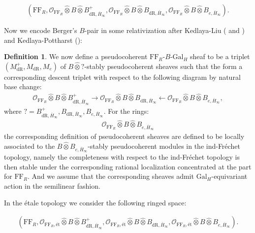 \documentclass[12pt]{amsart}
\theoremstyle{definition}
\newtheorem{definition}[theorem]{Definition}
\numberwithin{equation}{section}
\begin{document}
\begin{align}
(\mathrm{FF}_R,\mathcal{O}_{\mathrm{FF}_R}\widehat{\otimes}B\widehat{\otimes}B_{\mathrm{dR},\overline{H}_\infty}^+,\mathcal{O}_{\mathrm{FF}_R}\widehat{\otimes}B\widehat{\otimes}B_{\mathrm{dR},\overline{H}_\infty},\mathcal{O}_{\mathrm{FF}_R}\widehat{\otimes}B\widehat{\otimes}B_{e,\overline{H}_\infty}).	
\end{align}


\indent Now we encode Berger's $B$-pair in some relativization after Kedlaya-Liu (\cite[Definition 9.3.11]{KL1} and \cite[Definition 4.8.2]{KL2}) and Kedlaya-Pottharst (\cite[Definition 2.17]{KP}):

\begin{definition}
We now define a pseudocoherent $\mathrm{FF}_R$-$B$-$\mathrm{Gal}_H$ sheaf to be a triplet $(M^+_\mathrm{dR},M_\mathrm{dR},M_e)$ of $B\widehat{\otimes}?$-stably pseudocoherent sheaves such that the form a corresponding descent triplet with respect to the following diagram by natural base change:
\begin{align}
\mathcal{O}_{\mathrm{FF}_R}\widehat{\otimes}B\widehat{\otimes}B_{\mathrm{dR},\overline{H}_\infty}^+ \longrightarrow \mathcal{O}_{\mathrm{FF}_R}\widehat{\otimes}B\widehat{\otimes}B_{\mathrm{dR},\overline{H}_\infty}\longleftarrow \mathcal{O}_{\mathrm{FF}_R}\widehat{\otimes}B\widehat{\otimes}B_{e,\overline{H}_\infty},	
\end{align}
where $?=B_{\mathrm{dR},\overline{H}_\infty}^+,B_{\mathrm{dR},\overline{H}_\infty},B_{e,\overline{H}_\infty}$. For the rings:
\begin{align}
\mathcal{O}_{\mathrm{FF}_R}\widehat{\otimes}B\widehat{\otimes}B_{e,\overline{H}_\infty}	
\end{align}
the corresponding definition of pseudocoherent sheaves are defined to be locally associated to the $B\widehat{\otimes}B_{e,\overline{H}_\infty}$-stably pseudocoherent modules in the ind-Fr\'echet topology, namely the completeness with respect to the ind-Fr\'echet topology is then stable under the corresponding rational localization concentrated at the part for $\mathrm{FF}_R$. And we assume that the corresponding sheaves admit $\mathrm{Gal}_H$-equivariant action in the semilinear fashion.	
\end{definition}



\indent In the \'etale topology we consider the following ringed space:

\begin{align}
(\mathrm{FF}_R,\mathcal{O}_{\mathrm{FF}_R,\text{\'et}}\widehat{\otimes}B\widehat{\otimes}B_{\mathrm{dR},\overline{H}_\infty}^+,\mathcal{O}_{\mathrm{FF}_R,\text{\'et}}\widehat{\otimes}B\widehat{\otimes}B_{\mathrm{dR},\overline{H}_\infty},\mathcal{O}_{\mathrm{FF}_R,\text{\'et}}\widehat{\otimes}B\widehat{\otimes}B_{e,\overline{H}_\infty}).	
\end{align}
\end{document}
